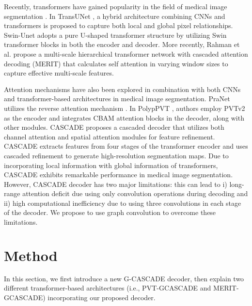 \documentclass[10pt,twocolumn,letterpaper]{article}
\begin{document}
Recently, transformers have gained popularity in the field of medical image segmentation \cite{cao2021swin, chen2021transunet, dong2021polyp, Rahman_2023_WACV, rahman2023multi, wang2022uctransnet, zhang2021transfuse}. In TransUNet \cite{chen2021transunet}, a hybrid architecture combining CNNs and transformers is proposed to capture both local and global pixel relationships. Swin-Unet \cite{cao2021swin} adopts a pure U-shaped transformer structure by utilizing Swin transformer blocks \cite{liu2021swin} in both the encoder and decoder. More recently, Rahman et al. \cite{rahman2023multi} propose a multi-scale hierarchical transformer network with cascaded attention decoding (MERIT) that calculates self attention in varying window sizes to capture effective multi-scale features.



Attention mechanisms have also been explored in combination with both CNNs \cite{oktay2018attention, fan2020pranet} and transformer-based architectures \cite{dong2021polyp} in medical image segmentation. PraNet \cite{fan2020pranet} utilizes the reverse attention mechanism \cite{chen2018reverse}. In PolypPVT \cite{dong2021polyp}, authors employ PVTv2 \cite{wang2022pvt} as the encoder and integrates CBAM \cite{woo2018cbam} attention blocks in the decoder, along with other modules. CASCADE \cite{Rahman_2023_WACV} proposes a cascaded decoder that utilizes both channel attention \cite{hu2018squeeze} and spatial attention \cite{chen2017sca} modules for feature refinement. CASCADE extracts features from four stages of the transformer encoder and uses cascaded refinement to generate high-resolution segmentation maps.
Due to incorporating local information with global information of transformers, CASCADE exhibits remarkable performance in medical image segmentation. However, CASCADE decoder has two major limitations: this can lead to i) long-range attention deficit due using only convolution operations during decoding and ii) high computational inefficiency due to using three  convolutions in each stage of the decoder. We propose to use graph convolution to overcome these limitations. 







\section{Method}
\label{sec:method}

In this section, we first introduce a new G-CASCADE decoder, then explain two different transformer-based architectures (i.e., PVT-GCASCADE and MERIT-GCASCADE) incorporating our proposed decoder.
\end{document}
